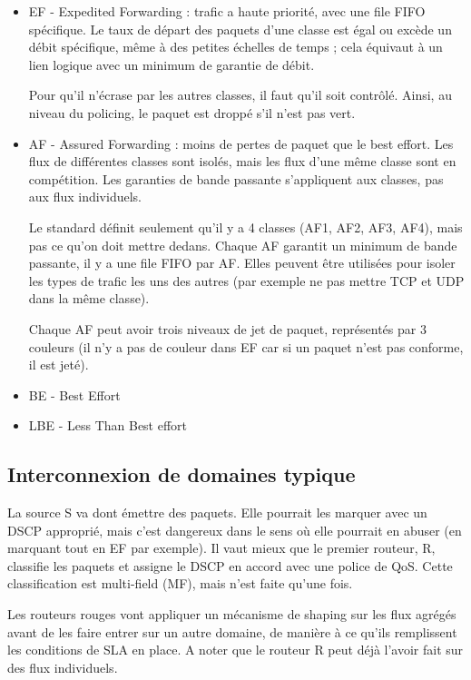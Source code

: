 			\begin{itemize}
				\item EF - Expedited Forwarding : trafic a haute priorité, avec une file FIFO spécifique. Le taux de départ des paquets d'une classe est égal ou excède un débit spécifique, même à des petites échelles de temps ; cela équivaut à un lien logique avec un minimum de garantie de débit.
				
				Pour qu'il n'écrase par les autres classes, il faut qu'il soit contrôlé. Ainsi, au niveau du policing, le paquet est droppé s'il n'est pas vert.
				
				\item AF - Assured Forwarding : moins de pertes de paquet que le best effort. Les flux de différentes classes sont isolés, mais les flux d'une même classe sont en compétition. Les garanties de bande passante s'appliquent aux classes, pas aux flux individuels.
				
				Le standard définit seulement qu'il y a 4 classes (AF1, AF2, AF3, AF4), mais pas ce qu'on doit mettre dedans. Chaque AF garantit un minimum de bande passante, il y a une file FIFO par AF. Elles peuvent être utilisées pour isoler les types de trafic les uns des autres (par exemple ne pas mettre TCP et UDP dans la même classe).
				
				Chaque AF peut avoir trois niveaux de jet de paquet, représentés par 3 couleurs (il n'y a pas de couleur dans EF car si un paquet n'est pas conforme, il est jeté).
				\item BE - Best Effort
				\item LBE - Less Than Best effort
			\end{itemize}
			
			\subsection{Interconnexion de domaines typique}
			
			
			La source S va dont émettre des paquets. Elle pourrait les marquer avec un DSCP approprié, mais c'est dangereux dans le sens où elle pourrait en abuser (en marquant tout en EF par exemple). Il vaut mieux que le premier routeur, R, classifie les paquets et assigne le DSCP en accord avec une police de QoS. Cette classification est multi-field (MF), mais n'est faite qu'une fois.
			
			Les routeurs rouges vont appliquer un mécanisme de shaping sur les flux agrégés avant de les faire entrer sur un autre domaine, de manière à ce qu'ils remplissent les conditions de SLA en place. A noter que le routeur R peut déjà l'avoir fait sur des flux individuels.
			
